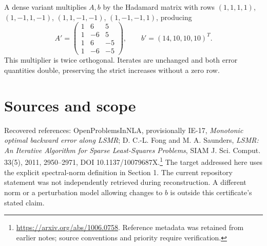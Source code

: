 \documentclass[11pt]{article}
\begin{document}
A dense variant multiplies $A,b$ by the Hadamard matrix with rows $(1,1,1,1)$, $(1,-1,1,-1)$, $(1,1,-1,-1)$, $(1,-1,-1,1)$, producing
\[
A'=\begin{pmatrix}1&6&5\\1&-6&5\\1&6&-5\\1&-6&-5\end{pmatrix},\qquad b'=(14,10,10,10)^T.
\]
This multiplier is twice orthogonal. Iterates are unchanged and both error quantities double, preserving the strict increases without a zero row.
\section{Sources and scope}
Recovered references: OpenProblemsInNLA, provisionally IE-17, \emph{Monotonic optimal backward error along LSMR}; D. C.-L. Fong and M. A. Saunders, \emph{LSMR: An Iterative Algorithm for Sparse Least-Squares Problems}, SIAM J. Sci. Comput. 33(5), 2011, 2950--2971, DOI 10.1137/10079687X.\footnote{\url{https://arxiv.org/abs/1006.0758}. Reference metadata was retained from earlier notes; source conventions and priority require verification.}
The target addressed here uses the explicit spectral-norm definition in Section 1. The current repository statement was not independently retrieved during reconstruction. A different norm or a perturbation model allowing changes to $b$ is outside this certificate's stated claim.
\end{document}
